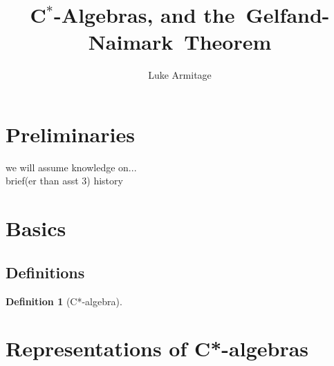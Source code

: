 \documentclass[12pt,a4paper]{amsart}
\author{Luke Armitage}
\title{C$^\ast$-Algebras, and the~Gelfand-Naimark~Theorem}
\theoremstyle{plain}
\theoremstyle{definition}
\newtheorem{defn}{Definition}
\begin{document}
\maketitle


\section{Preliminaries}
we will assume knowledge on... \\
brief(er than asst 3) history




\section{Basics}

\subsection{Definitions}
\begin{defn}[C*-algebra]
	
\end{defn}






\section{Representations of C*-algebras}
\end{document}
